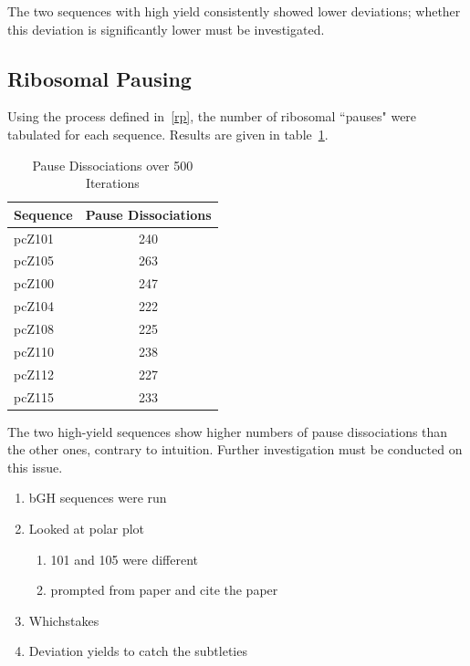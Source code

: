 \documentclass[10pt,twocolumn,draft]{article}
\begin{document}
The two sequences with high yield consistently showed lower deviations; whether this deviation is significantly lower must be investigated.

\subsection{Ribosomal Pausing}

Using the process defined in~\ref{rp}, the number of ribosomal ``pauses" were tabulated for each sequence.
Results are given in table~\ref{wichita}.

\begin{table}[htbp]
\begin{center}
\begin{tabular}{|lc|}\hline
\textbf{Sequence} & \textbf{Pause Dissociations}\\\hline
pcZ101 & 240\\
pcZ105 & 263\\\hline
pcZ100 & 247\\
pcZ104 & 222\\
pcZ108 & 225\\
pcZ110 & 238\\
pcZ112 & 227\\
pcZ115 & 233\\\hline
\end{tabular}
\caption{Pause Dissociations over 500 Iterations}
\label{wichita}
\end{center}
\end{table}

The two high-yield sequences show higher numbers of pause dissociations than the other ones, contrary to intuition.
Further investigation must be conducted on this issue.

\begin{enumerate}


\item bGH sequences were run

\item Looked at polar plot
    
    \begin{enumerate}
    
    \item 101 and 105 were different
    
    \item prompted from paper and cite the paper
    
    \end{enumerate}

\item Whichstakes

\item Deviation yields to catch the subtleties 

\end{enumerate}

\end{document}
